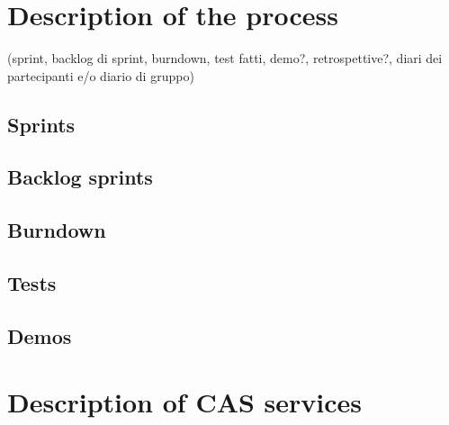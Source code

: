 \documentclass[a4paper,10pt]{report}
\begin{document}
\chapter{Description of the process} %
(sprint, backlog di sprint, burndown, test fatti, demo?, retrospettive?, diari dei partecipanti e/o diario di gruppo)
\section{Sprints} %
\section{Backlog sprints} %
\section{Burndown} %
\section{Tests} %
\section{Demos} %
\chapter{Description of CAS services} %
\end{document}
